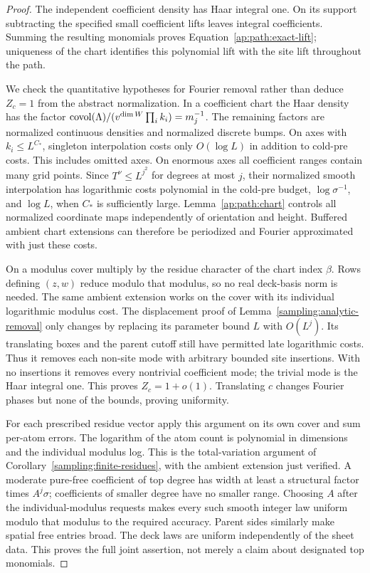 \begin{proof}
The independent coefficient density has Haar integral one.  On its
support subtracting the specified small coefficient lifts leaves
integral coefficients.  Summing the resulting monomials proves
Equation~\eqref{ap:path:exact-lift}; uniqueness of the chart identifies
this polynomial lift with the site lift throughout the path.

We check the quantitative hypotheses for Fourier removal rather than
deduce $Z_c=1$ from the abstract normalization.  In a coefficient
chart the Haar density has the factor
$\operatorname{covol}(\Lambda)/(v^{\dim W}\prod_i k_i)=m_j^{-1}$.
The remaining factors are normalized continuous densities and
normalized discrete bumps.  On axes with $k_i\le L^{C_*}$, singleton
interpolation costs only $O(\log L)$ in addition to cold-pre costs.
This includes omitted axes.  On enormous axes all coefficient ranges
contain many grid points.  Since $T^\nu\le L^{j^2}$ for degrees at
most $j$, their normalized smooth interpolation has logarithmic costs
polynomial in the cold-pre budget, $\log\sigma^{-1}$, and $\log L$,
when $C_*$ is sufficiently large.  Lemma~\ref{ap:path:chart} controls
all normalized coordinate maps independently of orientation and
height.  Buffered ambient chart extensions can therefore be
periodized and Fourier approximated with just these costs.

On a modulus cover multiply by the residue character of the chart
index $\beta$.  Rows defining $(z,w)$ reduce modulo that modulus,
so no real deck-basis norm is needed.  The same ambient extension
works on the cover with its individual logarithmic modulus cost.
The displacement proof of Lemma~\ref{sampling:analytic-removal}
only changes by replacing its parameter bound $L$ with $O(L^j)$.
Its translating boxes and the parent cutoff still have permitted
late logarithmic costs.  Thus it removes each non-site mode with
arbitrary bounded site insertions.  With no insertions it removes
every nontrivial coefficient mode; the trivial mode is the Haar
integral one.  This proves $Z_c=1+o(1)$.  Translating $c$ changes
Fourier phases but none of the bounds, proving uniformity.

For each prescribed residue vector apply this argument on its own
cover and sum per-atom errors.  The logarithm of the atom count is
polynomial in dimensions and the individual modulus log.  This is
the total-variation argument of
Corollary~\ref{sampling:finite-residues}, with the ambient extension
just verified.  A moderate pure-free coefficient of top degree has
width at least a structural factor times $A^j\sigma$; coefficients
of smaller degree have no smaller range.  Choosing $A$ after the
individual-modulus requests makes every such smooth integer law
uniform modulo that modulus to the required accuracy.  Parent sides
similarly make spatial free entries broad.  The deck laws are
uniform independently of the sheet data.  This proves the full
joint assertion, not merely a claim about designated top monomials.


\end{proof}
